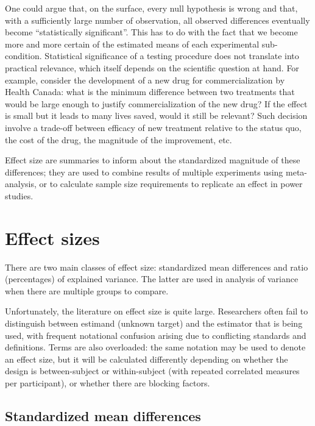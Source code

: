 \documentclass[
  11pt,
  letterpaper,
]{scrbook}
\theoremstyle{definition}
\theoremstyle{definition}
\theoremstyle{remark}
\begin{document}
One could argue that, on the surface, every null hypothesis is wrong and
that, with a sufficiently large number of observation, all observed
differences eventually become ``statistically significant''. This has to
do with the fact that we become more and more certain of the estimated
means of each experimental sub-condition. Statistical significance of a
testing procedure does not translate into practical relevance, which
itself depends on the scientific question at hand. For example, consider
the development of a new drug for commercialization by Health Canada:
what is the minimum difference between two treatments that would be
large enough to justify commercialization of the new drug? If the effect
is small but it leads to many lives saved, would it still be relevant?
Such decision involve a trade-off between efficacy of new treatment
relative to the status quo, the cost of the drug, the magnitude of the
improvement, etc.

Effect size are summaries to inform about the standardized magnitude of
these differences; they are used to combine results of multiple
experiments using meta-analysis, or to calculate sample size
requirements to replicate an effect in power studies.

\section{Effect sizes}\label{effect-sizes}

There are two main classes of effect size: standardized mean differences
and ratio (percentages) of explained variance. The latter are used in
analysis of variance when there are multiple groups to compare.

Unfortunately, the literature on effect size is quite large. Researchers
often fail to distinguish between estimand (unknown target) and the
estimator that is being used, with frequent notational confusion arising
due to conflicting standards and definitions. Terms are also overloaded:
the same notation may be used to denote an effect size, but it will be
calculated differently depending on whether the design is
between-subject or within-subject (with repeated correlated measures per
participant), or whether there are blocking factors.

\subsection{Standardized mean
differences}\label{standardized-mean-differences}
\end{document}
